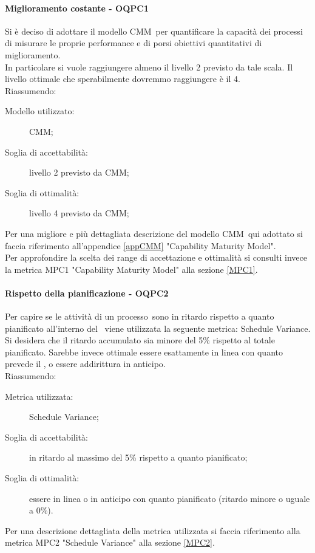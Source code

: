 \documentclass[../PianoDiQualifica.tex]{subfiles}
\begin{document}
		\paragraph{Miglioramento costante - OQPC1}
		Si è deciso di adottare il modello CMM\g\ per quantificare la capacità dei processi di misurare le proprie performance e di porsi obiettivi quantitativi di miglioramento.\\
		In particolare si vuole raggiungere almeno il livello 2 previsto da tale scala. Il livello ottimale che sperabilmente dovremmo raggiungere è il 4.\\
		Riassumendo:
		\begin{description}
			\item[Modello utilizzato:] CMM\g;
			\item[Soglia di accettabilità:] livello 2 previsto da CMM\g;
			\item[Soglia di ottimalità:] livello 4 previsto da CMM\g;
		\end{description}
		Per una migliore e più dettagliata descrizione del modello CMM\g\ qui adottato si faccia riferimento all'appendice \ref{appCMM} "Capability Maturity Model".\\
		Per approfondire la scelta dei range di accettazione e ottimalità si consulti invece la metrica MPC1 "Capability Maturity Model" alla sezione \ref{MPC1}.
		
		\paragraph{Rispetto della pianificazione - OQPC2}
		Per capire se le attività di un processo\g\ sono in ritardo rispetto a quanto pianificato all’interno del \pianodiprogetto\ viene utilizzata la seguente metrica: Schedule Variance.\\
		Si desidera che il ritardo accumulato sia minore del 5\% rispetto al totale pianificato. Sarebbe invece ottimale essere esattamente in linea con quanto prevede il \pianodiprogetto, o essere addirittura in anticipo.\\
		Riassumendo:
		\begin{description}
			\item[Metrica utilizzata:] Schedule Variance;
			\item[Soglia di accettabilità:] in ritardo al massimo del 5\% rispetto a quanto pianificato;
			\item[Soglia di ottimalità:] essere in linea o in anticipo con quanto pianificato (ritardo minore o uguale a 0\%).
		\end{description}
		Per una descrizione dettagliata della metrica utilizzata si faccia riferimento alla metrica MPC2 "Schedule Variance" alla sezione \ref{MPC2}.
		
\end{document}
